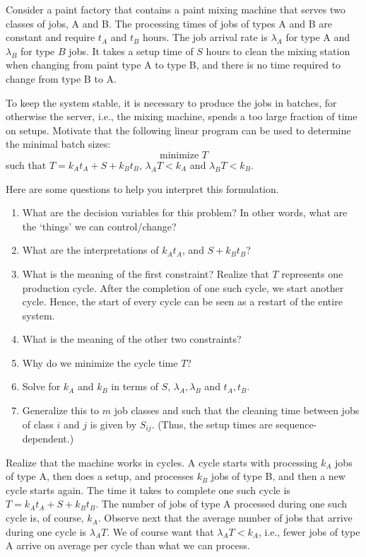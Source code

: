 \begin{exercise}
 Consider a paint factory that contains a paint mixing machine that serves two classes of jobs, A and B.
 The processing times of jobs of types A and B are constant and require $t_A$ and $t_B$ hours.
 The job arrival rate is $\lambda_A$ for type A and $\lambda_B$ for type $B$ jobs.
 It takes a setup time of $S$ hours to clean the mixing station when changing from paint type A to type B, and there is no time required to change from type B to A.

 To keep the system  stable, it is necessary to produce the jobs in batches, for otherwise the server, i.e., the mixing machine, spends a too large fraction of time on setups.
 Motivate that the following linear program can be used to determine the minimal batch sizes:
\begin{equation*}
 \text{minimize } T
\end{equation*}
such that $ T= k_A t_A + S + k_B t_B$, $\lambda_A T < k_A$ and $\lambda_B T < k_B$.
\begin{hint}
Here are some questions to help you interpret this formulation.
\begin{enumerate}
\item What are the decision variables for this problem? In other words, what are the `things' we can control/change?
\item What are the interpretations of $k_A t_A$, and $S+k_B t_B$?
\item What is the meaning of the first constraint? Realize that $T$
 represents one production cycle. After the completion of one such
 cycle, we start another cycle. Hence, the start of every cycle can
 be seen as a restart of the entire system.
\item What is the meaning of the other two constraints?
\item Why do we minimize the cycle time $T$?
\item Solve for $k_A$ and $k_B$ in terms of $S$, $\lambda_A, \lambda_B$ and $t_A, t_B$. 
\item Generalize this to $m$ job classes and such that the cleaning
 time between jobs of class $i$ and $j$ is given by $S_{i j}$. (Thus,
 the setup times are sequence-dependent.) 
\end{enumerate}
\end{hint}

\begin{solution}
 Realize that the machine works in cycles. A cycle starts with
 processing $k_A$ jobs of type A, then does a setup, and processes
 $k_B$ jobs of type B, and then a new cycle starts again. The time
 it takes to complete one such cycle is $T=k_A t_A + S + k_B t_B$.
 The number of jobs of type A processed during one such cycle is,
 of course, $k_A$. Observe next that the average number of jobs
 that arrive during one cycle is $\lambda_A T$. We of course want
 that $\lambda_A T< k_A$, i.e., fewer jobs of type A arrive on
 average per cycle than what we can process.
\end{solution}
\end{exercise}



